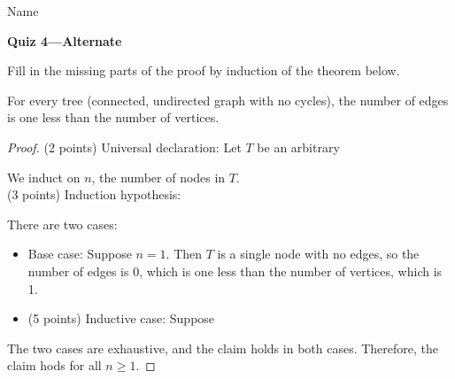 \documentclass[11pt]{article}
\begin{document}
\noindent Name \underline{\hspace{12cm}}\\


\begin{center}
\LARGE\textbf{Quiz 4---Alternate}%
\end{center}

Fill in the missing parts of the proof by induction of the theorem below.


\begin{theorem*}
    For every tree (connected, undirected graph with no cycles), the number of
    edges is one less than the number of vertices.
\end{theorem*}

\begin{proof}
\noindent (2 points) Universal declaration: Let $T$ be an arbitrary 
\vspace{.3in}

\noindent We induct on $n$, the number of nodes in $T$.
\\

\noindent (3 points) Induction hypothesis:
\vspace{.8in}    

\noindent There are two cases:
\begin{itemize}
    \item 
Base case: Suppose $n=1$. Then $T$ is a single node with no edges, so the number
of edges is 0, which is one less than the number of vertices, which is 1.
\item (5 points) Inductive case: Suppose 
\vspace{3.8in}
\end{itemize}
\noindent The two cases are exhaustive, and the claim holds in both cases.
Therefore, the claim hods for all $n\ge 1$.

    
\end{proof}

\end{document}
